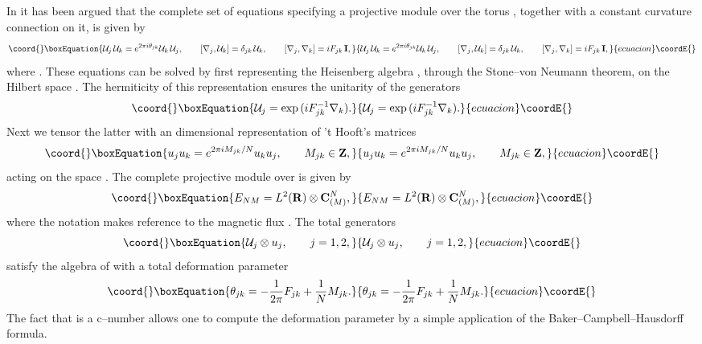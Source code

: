 \documentclass[a4paper,a4paper]{article}
\begin{document}
In \cite{KONECHNYSCHWARZ} it has been argued that the complete set  
of equations specifying a projective module over the torus \coordHE{}, 
together with a constant curvature connection on it, is given by  
\begin{equation}\coord{}\boxEquation{  
{\cal U}_j\,{\cal U}_k=e^{2\pi i\theta_{jk}}{\cal U}_k\,{\cal U}_j,\qquad  
\left[\nabla_j, {\cal U}_k\right]=\delta_{jk}\,{\cal U}_k,\qquad  
\left[\nabla_j,\nabla_k\right]=iF_{jk}\,{\bf  I},  
\label{konsch}
}{  
{\cal U}_j\,{\cal U}_k=e^{2\pi i\theta_{jk}}{\cal U}_k\,{\cal U}_j,\qquad  
\left[\nabla_j, {\cal U}_k\right]=\delta_{jk}\,{\cal U}_k,\qquad  
\left[\nabla_j,\nabla_k\right]=iF_{jk}\,{\bf  I},  
}{ecuacion}\coordE{}\end{equation}  
where \coordHE{}. These equations can be solved by first representing  
the Heisenberg algebra  
\coordHE{}, through the  
Stone--von Neumann theorem, on the Hilbert space \coordHE{}. 
The hermiticity of this representation ensures the unitarity of the generators 
\begin{equation}\coord{}\boxEquation{
{\cal U}_j={\rm exp}\,(iF^{-1}_{jk}\nabla_k).
\label{genecalu}
}{
{\cal U}_j={\rm exp}\,(iF^{-1}_{jk}\nabla_k).
}{ecuacion}\coordE{}\end{equation}
Next we tensor the latter with an \coordHE{} dimensional representation of  
't Hooft's matrices \coordHE{}  
\begin{equation}\coord{}\boxEquation{  
u_ju_k=e^{2\pi i M_{jk}/N}u_ku_j,\qquad M_{jk}\in{\bf Z},  
\label{thoftmat}
}{  
u_ju_k=e^{2\pi i M_{jk}/N}u_ku_j,\qquad M_{jk}\in{\bf Z},  
}{ecuacion}\coordE{}\end{equation}  
acting on the space \coordHE{}. The complete projective module over 
\coordHE{} is given by
\begin{equation}\coord{}\boxEquation{
E_{NM}=L^2({\bf R})\otimes {\bf C}^N_{(M)},
\label{totamod}
}{
E_{NM}=L^2({\bf R})\otimes {\bf C}^N_{(M)},
}{ecuacion}\coordE{}\end{equation}
where the notation \coordHE{} makes reference to the magnetic flux 
\coordHE{}.  The total generators 
\begin{equation}\coord{}\boxEquation{
{\cal U}_j\otimes u_j, \qquad j=1,2,
\label{turuturu}
}{
{\cal U}_j\otimes u_j, \qquad j=1,2,
}{ecuacion}\coordE{}\end{equation}
satisfy the algebra of \coordHE{} with a total deformation 
parameter
\begin{equation}\coord{}\boxEquation{
\theta_{jk}=-{1\over 2\pi } F_{jk} + {1\over N}M_{jk}.
\label{totdefpara}
}{
\theta_{jk}=-{1\over 2\pi } F_{jk} + {1\over N}M_{jk}.
}{ecuacion}\coordE{}\end{equation}
The fact that \coordHE{} is a c--number allows one to compute 
the deformation parameter by a simple application of
the Baker--Campbell--Hausdorff formula.  
  
\end{document}
